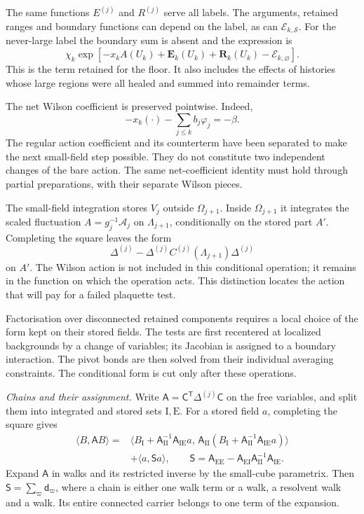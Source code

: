 \documentclass[11pt,letterpaper,reqno]{amsart}
\theoremstyle{definition}
\theoremstyle{remark}
\begin{document}
The same functions $E^{(j)}$ and $R^{(j)}$
serve all labels. The arguments, retained
ranges and boundary functions can depend
on the label, as can
$\mathcal E_{k,\mathcal S}$.
For the never-large label the boundary
sum is absent and the expression is
\[
 \chi_k\exp[-x_kA(U_k)
                   +\mathbf E_k(U_k)+\mathbf R_k(U_k)
                   -\mathcal E_{k,\varnothing}].
\]
This is the term retained for the floor.
It also includes the effects of histories
whose large regions were all healed and
summed into remainder terms.

The net Wilson coefficient is preserved
pointwise. Indeed,
\[
 -x_k(\cdot)-\sum_{j\le k}b_j\varphi_j=-\beta.
\]
The regular action coefficient and its
counterterm have been separated to make
the next small-field step possible.
They do not constitute two independent
changes of the bare action. The same
net-coefficient identity must hold
through partial preparations, with
their separate Wilson pieces.

The small-field integration stores $V_j$ outside $\Omega_{j+1}$.
Inside $\Omega_{j+1}$ it integrates the scaled fluctuation
$A=g_j^{-1}\mathcal A_j$ on $\Lambda_{j+1}$, conditionally on the
stored part $A'$. Completing the square leaves the form
\begin{equation}\label{eq:stored-schur}
 \Delta^{(j)}-\Delta^{(j)}
 C^{(j)}(\Lambda_{j+1})\Delta^{(j)}
\end{equation}
on $A'$. The Wilson action is not included in this conditional
operation; it remains in the function on which the operation acts.
This distinction locates the action that will pay for a failed
plaquette test.

Factorisation over disconnected retained components requires a
local choice of the form kept on their stored fields.
The tests are first recentered at localized backgrounds
by a change of variables; its Jacobian is assigned to
a boundary interaction. The pivot bonds are then solved
from their individual averaging constraints. The
conditional form is cut only after these operations.

\emph{Chains and their assignment.}
Write \(\mathsf A=\mathsf C^{\mathsf T}\Delta^{(j)}\mathsf C\)
on the free variables, and split them into integrated
and stored sets \(\mathrm I,\mathrm E\). For a stored
field \(a\), completing the square gives
\[
 \begin{split}
 \langle B,\mathsf AB\rangle
 ={}&\langle B_{\mathrm I}
       +\mathsf A_{\mathrm{II}}^{-1}\mathsf A_{\mathrm{IE}}a,\,
       \mathsf A_{\mathrm{II}}(B_{\mathrm I}
       +\mathsf A_{\mathrm{II}}^{-1}\mathsf A_{\mathrm{IE}}a)\rangle\\
 &+\langle a,\mathsf Sa\rangle,\qquad
 \mathsf S=\mathsf A_{\mathrm{EE}}
       -\mathsf A_{\mathrm{EI}}\mathsf A_{\mathrm{II}}^{-1}
                                      \mathsf A_{\mathrm{IE}} .
 \end{split}
\]
Expand \(\mathsf A\) in walks and its restricted inverse
by the small-cube parametrix. Then
\(\mathsf S=\sum_\varpi\mathsf d_\varpi\), where a chain
is either one walk term or a walk, a resolvent walk
and a walk. Its entire connected carrier belongs to
one term of the expansion.
\end{document}
